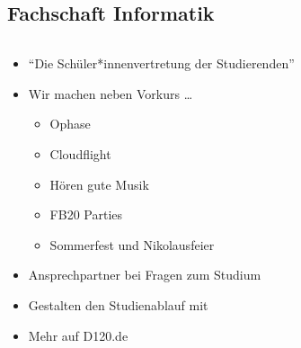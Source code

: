 \subsection*{Fachschaft Informatik}
\begin{frame}
    \slidehead
    \begin{columns}[T]
        \begin{column}{.6\textwidth}
            \begin{itemize}[<+->]
                \item \enquote{Die Schüler*innenvertretung der Studierenden}
                \item Wir machen neben Vorkurs \dots
                    \begin{itemize}
                        \item Ophase
                        \item Cloudflight
                        \item Hören gute Musik
                        \item FB20 Parties
                        \item Sommerfest und Nikolausfeier
                    \end{itemize}
                \item Ansprechpartner bei Fragen zum Studium
                \item Gestalten den Studienablauf mit
                    \vspace{.4cm}
                \item {\centering \huge Mehr auf D120.de}
            \end{itemize}
        \end{column}%
        \begin{column}{.4\textwidth}
            \vfill
\end{column}
\end{columns}
\end{frame}

